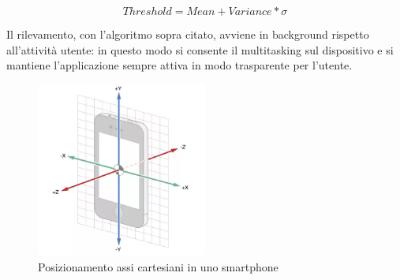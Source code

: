\documentclass[a4paper,10pt]{memoir}
\begin{document}
\begin{equation} \label{eq:soglia}
Threshold = Mean + Variance * \sigma
\end{equation}

Il rilevamento, con l'algoritmo sopra citato, avviene in background rispetto all'attività utente: in questo modo si consente il multitasking sul dispositivo e si mantiene l'applicazione sempre attiva in modo trasparente per l'utente.

\begin{figure}[ht]
\centering
\caption{Posizionamento assi cartesiani in uno smartphone}
\label{fig:scsaxes}
\includegraphics[width=0.5\textwidth]{introduzione/smartphone_axes}
\end{figure}


\begin{figure}[ht]

\end{figure}
\end{document}
